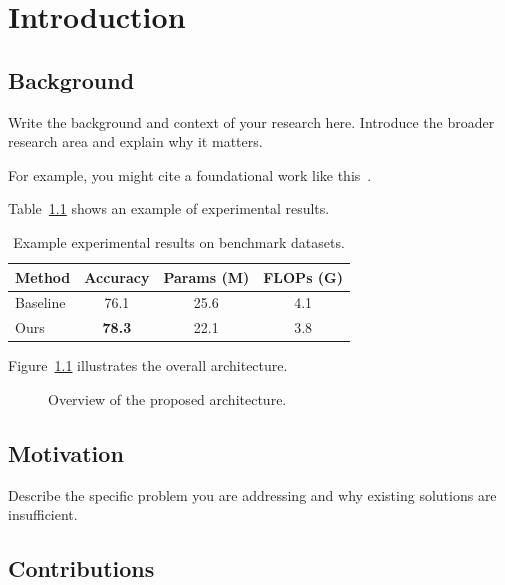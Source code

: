 \chapter{Introduction}
\label{ch:introduction}


\section{Background}
\label{sec:background}

Write the background and context of your research here. Introduce the broader
research area and explain why it matters.

For example, you might cite a foundational work like this~\cite{vaswani2017attention}.

Table~\ref{tab:example} shows an example of experimental results.

\begin{table}[h]
  \centering
  \caption{Example experimental results on benchmark datasets.}
  \label{tab:example}
  \begin{tabular}{lccc}
    \toprule
    Method & Accuracy & Params (M) & FLOPs (G) \\
    \midrule
    Baseline & 76.1 & 25.6 & 4.1 \\
    Ours     & \textbf{78.3} & 22.1 & 3.8 \\
    \bottomrule
  \end{tabular}
\end{table}

Figure~\ref{fig:example} illustrates the overall architecture.

\begin{figure}[h]
  \centering
  \caption{Overview of the proposed architecture.}
  \label{fig:example}
\end{figure}

\section{Motivation}
\label{sec:motivation}

Describe the specific problem you are addressing and why existing solutions
are insufficient.

\section{Contributions}
\label{sec:contributions}

